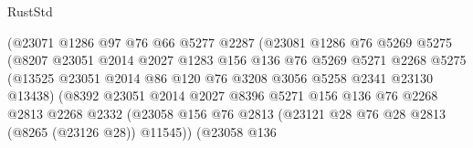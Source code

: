 \begin{lexlean}{RustStd}
\begin{coremodule}
                                  (@23071
                                    @1286
                                    @97
                                    @76
                                    @66
                                    @5277
                                    @2287
                                    (@23081
                                      @1286
                                      @76
                                      @5269
                                      @5275
                                      (@8207
                                        @23051
                                        @2014
                                        @2027
                                        @1283
                                        @156
                                        @136
                                        @76
                                        @5269
                                        @5271
                                        @2268
                                        @5275
                                        (@13525
                                          @23051
                                          @2014
                                          @86
                                          @120
                                          @76
                                          @3208
                                          @3056
                                          @5258
                                          @2341
                                          @23130
                                          @13438)
                                        (@8392
                                          @23051
                                          @2014
                                          @2027
                                          @8396
                                          @5271
                                          @156
                                          @136
                                          @76
                                          @2268
                                          @2813
                                          @2268
                                          @2332
                                          (@23058
                                            @156
                                            @76
                                            @2813
                                            (@23121 @28 @76 @28 @2813 (@8265 (@23126 @28)) @11545))
                                          (@23058
                                            @136

\end{coremodule}
\end{lexlean}

